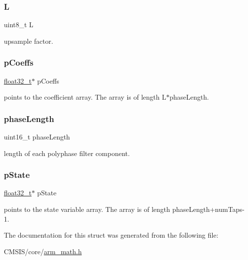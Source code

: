 \subsubsection{\texorpdfstring{L}{L}}
{\footnotesize\ttfamily uint8\+\_\+t L}

upsample factor. \mbox{\label{structarm__fir__interpolate__instance__f32_aacbb8dd8eeba4b21fc2bb40076405ee3}} 
\subsubsection{\texorpdfstring{pCoeffs}{pCoeffs}}
{\footnotesize\ttfamily \mbox{\hyperlink{arm__math_8h_a4611b605e45ab401f02cab15c5e38715}{float32\+\_\+t}}$\ast$ p\+Coeffs}

points to the coefficient array. The array is of length L$\ast$phase\+Length. \mbox{\label{structarm__fir__interpolate__instance__f32_a8f92bb07e0812f94679438cdf412b26a}} 
\subsubsection{\texorpdfstring{phaseLength}{phaseLength}}
{\footnotesize\ttfamily uint16\+\_\+t phase\+Length}

length of each polyphase filter component. \mbox{\label{structarm__fir__interpolate__instance__f32_a335c87e6fdc4b96601d95a5de8b9c463}} 
\subsubsection{\texorpdfstring{pState}{pState}}
{\footnotesize\ttfamily \mbox{\hyperlink{arm__math_8h_a4611b605e45ab401f02cab15c5e38715}{float32\+\_\+t}}$\ast$ p\+State}

points to the state variable array. The array is of length phase\+Length+num\+Taps-\/1. 

The documentation for this struct was generated from the following file\+:\begin{DoxyCompactItemize}
\item 
C\+M\+S\+I\+S/core/\mbox{\hyperlink{arm__math_8h}{arm\+\_\+math.\+h}}\end{DoxyCompactItemize}
